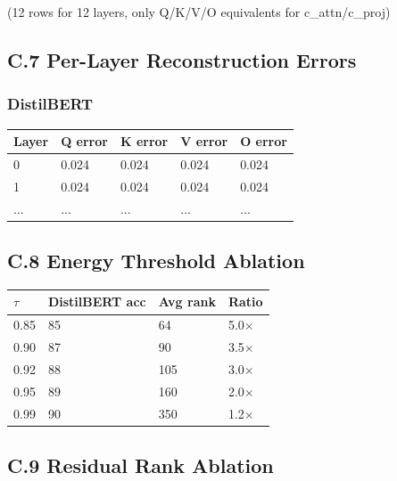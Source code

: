 (12 rows for 12 layers, only Q/K/V/O equivalents for c\_attn/c\_proj)

\subsection{C.7 Per-Layer Reconstruction Errors}

\subsubsection{DistilBERT}

\begin{table}[H]
\centering
\small
\begin{tabular}{lllll}
\toprule
\textbf{Layer} & \textbf{Q error} & \textbf{K error} & \textbf{V error} & \textbf{O error} \\
\midrule
0 & 0.024 & 0.024 & 0.024 & 0.024 \\
1 & 0.024 & 0.024 & 0.024 & 0.024 \\
... & ... & ... & ... & ... \\
\bottomrule
\end{tabular}
\end{table}

\subsection{C.8 Energy Threshold Ablation}

\begin{table}[H]
\centering
\small
\begin{tabular}{llll}
\toprule
\textbf{$\tau$} & \textbf{DistilBERT acc} & \textbf{Avg rank} & \textbf{Ratio} \\
\midrule
0.85 & 85 & 64 & 5.0$\times$ \\
0.90 & 87 & 90 & 3.5$\times$ \\
0.92 & 88 & 105 & 3.0$\times$ \\
0.95 & 89 & 160 & 2.0$\times$ \\
0.99 & 90 & 350 & 1.2$\times$ \\
\bottomrule
\end{tabular}
\end{table}

\subsection{C.9 Residual Rank Ablation}

